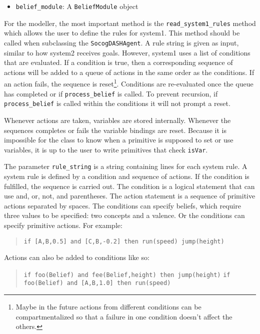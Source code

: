 \documentclass[11pt, a4paper]{article}
\begin{document}
\begin{itemize}
    \item \texttt{belief\_module}: A \texttt{BeliefModule} object
\end{itemize}

For the modeller, the most important method is the \texttt{read\_system1\_rules} method which allows the user to define the rules for system1. This method should be called when subclassing the \texttt{SocogDASHAgent}. A rule string is given as input, similar to how system2 receives goals. However, system1 uses a list of conditions that are evaluated. If a condition is true, then a corresponding sequence of actions will be added to a queue of actions in the same order as the conditions. If an action fails, the sequence is reset\footnote{Maybe in the future actions from different conditions can be compartmentalized so that a failure in one condition doesn't affect the others.}. Conditions are re-evaluated once the queue has completed or if \texttt{process\_belief} is called. To prevent recursion, if \texttt{process\_belief} is called within the conditions it will not prompt a reset.

Whenever actions are taken, variables are stored internally. Whenever the sequences completes or fails the variable bindings are reset. Because it is impossible for the class to know when a primitive is supposed to set or use variables, it is up to the user to write primitives that check \texttt{isVar}.

The parameter \texttt{rule\_string} is a string containing lines for each system rule. A system rule is defined by a condition and sequence of actions. If the condition is fulfilled, the sequence is carried out. The condition is a logical statement that can use and, or, not, and parentheses. The action statement is a sequence of primitive actions separated by spaces. The conditions can specify beliefs, which require three values to be specified: two concepts and a valence. Or the conditions can specify primitive actions. For example:

\begin{quote}
\texttt{if [A,B,0.5] and [C,B,-0.2] then run(speed) jump(height)}
\end{quote}

Actions can also be added to conditions like so:

\begin{quote}
\texttt{if foo(Belief) and fee(Belief,height) then jump(height)}
\texttt{if foo(Belief) and [A,B,1.0] then run(speed)}
\end{quote}
\end{document}
